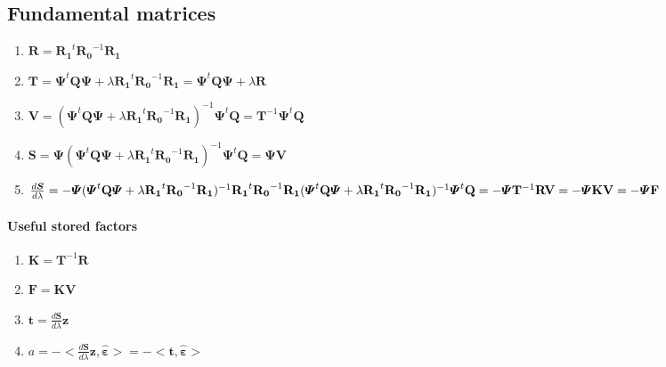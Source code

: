 \documentclass[11pt,twoside]{report}
\begin{document}
\subsection{Fundamental matrices}
\begin{enumerate}
	\item $ \mathbf{R} = \mathbf{R_1}^t\mathbf{R_0}^{-1}\mathbf{R_1}$
	\item $ \mathbf{T} = \boldsymbol{\Psi}^t\mathbf{Q}\boldsymbol{\Psi}+\lambda\mathbf{R_1}^t\mathbf{R_0}^{-1}\mathbf{R_1} = \boldsymbol{\Psi}^t\mathbf{Q}\boldsymbol{\Psi}+\lambda\mathbf{R}$
	\item $\mathbf{V} = (\boldsymbol{\Psi}^t\mathbf{Q}\boldsymbol{\Psi}+\lambda\mathbf{R_1}^t\mathbf{R_0}^{-1}\mathbf{R_1})^{-1}\boldsymbol{\Psi}^t\mathbf{Q} = \boldsymbol{T}^{-1}\boldsymbol{\Psi}^t\mathbf{Q}$
	\item $ \mathbf{S} =  \boldsymbol{\Psi}(\boldsymbol{\Psi}^t\mathbf{Q}\boldsymbol{\Psi}+\lambda\mathbf{R_1}^t\mathbf{R_0}^{-1}\mathbf{R_1})^{-1}\boldsymbol{\Psi}^t\mathbf{Q} = \boldsymbol{\Psi}\boldsymbol{V}$
	\item $\frac{d\mathbold{S}}{d\lambda} = -\boldsymbol{\Psi}(\boldsymbol{\Psi}^t\mathbf{Q}\boldsymbol{\Psi}+\lambda\mathbf{R_1}^t\mathbf{R_0}^{-1}\mathbf{R_1})^{-1}\mathbf{R_1}^t\mathbf{R_0}^{-1}\mathbf{R_1}(\boldsymbol{\Psi}^t\mathbf{Q}\boldsymbol{\Psi}+\lambda\mathbf{R_1}^t\mathbf{R_0}^{-1}\mathbf{R_1})^{-1}\boldsymbol{\Psi}^t\mathbf{Q}\\
	= -\boldsymbol{\Psi}\mathbf{T}^{-1}\mathbf{R}\mathbf{V} = -\boldsymbol{\Psi}\mathbf{K}\mathbf{V} = -\boldsymbol{\Psi}\mathbf{F}$
\end{enumerate}


\paragraph{Useful stored factors}
\begin{enumerate}
	\item $\mathbf{K} = \mathbf{T}^{-1}\mathbf{R}$
	\item $\mathbf{F} = \mathbf{K}\mathbf{V}$
	\item $\mathbf{t} = \frac{d\mathbold{S}}{d\lambda}\mathbold{z}$
	\item $ a = -<\frac{d\mathbold{S}}{d\lambda}\mathbold{z}, \hat{\mathbold{\varepsilon}}> = -<\mathbf{t}, \hat{\mathbold{\varepsilon}}>$
\end{enumerate}
\newpage
\end{document}
